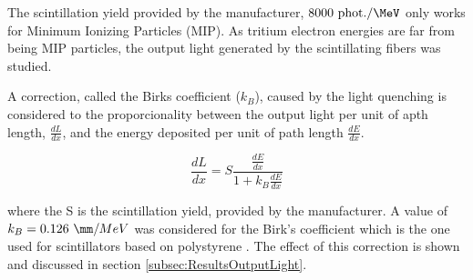 The scintillation yield provided by the manufacturer, $8000~\text{phot.}/\MeV$ only works for Minimum Ionizing Particles (MIP). As tritium electron energies are far from being MIP particles, the output light generated by the scintillating fibers was studied. 

A correction, called the Birks coefficient ($k_B$), caused by the light quenching is considered to the proporcionality between the output light per unit of apth length, $\frac{dL}{dx}$, and the energy deposited per unit of path length $\frac{dE}{dx}$\cite{BirksPaper}.

\begin{equation}
\frac{dL}{dx}= S\frac{\frac{dE}{dx}}{1+k_B\frac{dE}{dx}}
\label{eq:birkscoefficient}
\end{equation}

where the S is the scintillation yield, provided by the manufacturer. A value of $k_B=0.126~\mm/MeV$ was considered for the Birk's coefficient which is the one used for scintillators based on polystyrene \cite{BirksCoefficient}. The effect of this correction is shown and discussed in section \ref{subsec:ResultsOutputLight}.